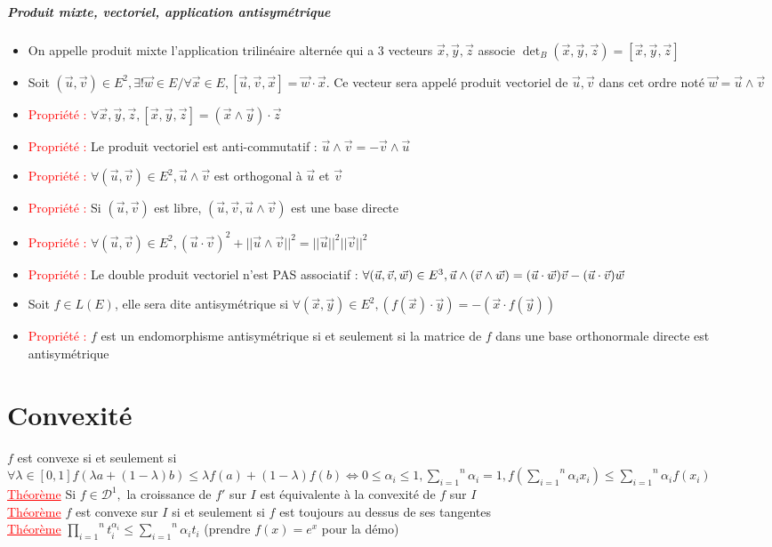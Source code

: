 \documentclass[a4paper, 11pt, french]{article}
\newcommand{\p}{\wedge}
\newcommand{\D}{\mathcal{D}}
\newcommand{\al}{\alpha}
\newcommand{\la}{\lambda}
\newcommand{\som}[2]{\overset{#2}{\underset{#1}{\sum}}}
\newcommand{\produit}[2]{\overset{#2}{\underset{#1}{\prod}}}
\newcommand{\thm}{\textcolor{red}{\underline{Théorème} }}
\newcommand{\ppt}{\textcolor{red}{Propriété : }}
\begin{document}
	\subparagraph*{Produit mixte, vectoriel, application antisymétrique}
	\begin{itemize}
 		\item On appelle produit mixte l'application trilinéaire alternée qui a 3 vecteurs $\vec{x}, \vec{y}, \vec{z}$ associe $\det_B(\vec{x},\vec{y},\vec{z})=[\vec{x},\vec{y},\vec{z}]$
 		\item Soit $(\vec{u},\vec{v}) \in E^2, \exists! \vec{w} \in E / \forall \vec{x} \in E, [\vec{u},\vec{v},\vec{x}]=\vec{w}\cdot\vec{x}.$ Ce vecteur sera appelé produit vectoriel de $\vec{u},\vec{v}$ dans cet ordre noté $\vec{w}=\vec{u}\p\vec{v}$
		\item \ppt $\forall \vec{x},\vec{y},\vec{z}, [\vec{x},\vec{y},\vec{z}]=(\vec{x}\p\vec{y})\cdot\vec{z}$
		\item \ppt Le produit vectoriel est anti-commutatif : $\vec{u}\p\vec{v}=-\vec{v}\p\vec{u}$
		\item \ppt $\forall (\vec{u},\vec{v}) \in E^2, \vec{u}\p\vec{v}$ est orthogonal à $\vec{u}$ et $\vec{v}$
		\item \ppt Si $(\vec{u},\vec{v})$ est libre, $(\vec{u},\vec{v},\vec{u}\p\vec{v})$ est une base directe
		\item \ppt $\forall (\vec{u},\vec{v}) \in E^2, (\vec{u}\cdot\vec{v})^2+||\vec{u}\p\vec{v}||^2=||\vec{u}||^2||\vec{v}||^2$
		\item \ppt Le double produit vectoriel n'est PAS associatif : $\forall (\vec{u},\vec{v},\vec{w}) \in E^3,\\ {\vec{u}\p (\vec{v} \p \vec{w})=(\vec{u} \cdot \vec{w})\vec{v}-(\vec{u} \cdot \vec{v})\vec{w}}$
		\item Soit $f \in L(E)$, elle sera dite antisymétrique si $\forall (\vec{x},\vec{y}) \in E^2, (f(\vec{x})\cdot\vec{y})=-(\vec{x}\cdot f(\vec{y}))$
		\item \ppt $f$ est un endomorphisme antisymétrique si et seulement si la matrice de $f$ dans une base orthonormale directe est antisymétrique
	\end{itemize}

	\section*{Convexité}
	 $f$ est convexe si et seulement si $\forall \la \in [0,1] f(\la a+(1-\la)b) \leqslant \la f(a)+(1-\la)f(b) \iff 0 \leqslant \al_i \leqslant 1, \som{i=1}{n}\al_i=1, f(\som{i=1}{n}\al_i x_i) \leqslant \som{i=1}{n}\al_i f(x_i)$ \\
	 \thm Si $f \in \D^1,$ la croissance de $f'$ sur $I$ est équivalente à la convexité de $f$ sur $I$ \\
	 \thm $f$ est convexe sur $I$ si et seulement si $f$ est toujours au dessus de ses tangentes \\
	 \thm $\produit{i=1}{n}t_i^{\al_i} \leqslant \som{i=1}{n}\al_it_i$ (prendre $f(x)=e^x$ pour la démo)
\end{document}
